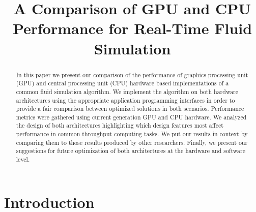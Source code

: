 \documentclass[conference]{IEEEtran}
\begin{document}
\title{A Comparison of GPU and CPU Performance for Real-Time Fluid Simulation}

\author{
}

\maketitle

\begin{abstract}

In this paper we present our comparison of the performance of graphics processing unit (GPU) and central processing unit (CPU) hardware based implementations of a common fluid simulation algorithm. We implement the algorithm on both hardware architectures using the appropriate application programming interfaces in order to provide a fair comparison between optimized solutions in both scenarios. Performance metrics were gathered using current generation GPU and CPU hardware. We analyzed the design of both architectures highlighting which design features most affect performance in common throughput computing tasks. We put our results in context by comparing them to those results produced by other researchers. Finally, we present our suggestions for future optimization of both architectures at the hardware and software level.

\end{abstract}

\IEEEpeerreviewmaketitle

\section{Introduction}
\end{document}

